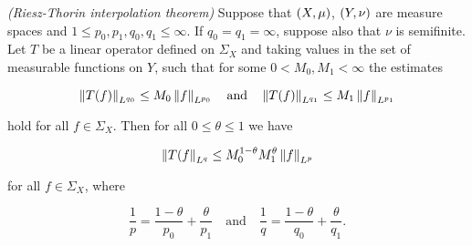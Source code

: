 \vspace{2mm}

\begin{mdframed}
	\begin{theorem}\emph{(Riesz-Thorin interpolation theorem)}
		Suppose that $\del{X,\mu}$, $\del{Y,\nu}$ are measure spaces and $1 \leq p_0,p_1,q_0,q_1 \leq \infty$. If $q_0 = q_1 = \infty$, suppose also that $\nu$ is semifinite. Let $T$ be a linear operator defined on $\Sigma_X$ and taking values in the set of measurable functions on $Y$, such that for some $0 < M_0,M_1 < \infty$ the estimates 

		\begin{equation}
			\norm[0]{T(f)}_{L^{q_0}} \leq M_0\norm[0]{f}_{L^{p_0}} \quad \text{and} \quad \norm[0]{T(f)}_{L^{q_1}} \leq M_1\norm[0]{f}_{L^{p_1}}
			\label{hyp:Lq0Lq1}
		\end{equation}

		\noindent hold for all $f \in \Sigma_X$. Then for all $0 \leq \theta \leq 1$ we have

		\begin{equation}
			\norm[0]{T(f}_{L^q} \leq M_0^{1 - \theta}M_1^\theta\norm[0]{f}_{L^p}
			\label{est:boundTf}
		\end{equation}

		\noindent for all $f \in \Sigma_X$, where

		\begin{equation*}
			\frac{1}{p} = \frac{1 - \theta}{p_0} + \frac{\theta}{p_1} \quad \text{and} \quad \frac{1}{q} = \frac{1 - \theta}{q_0} + \frac{\theta}{q_1}.
		\end{equation*}
		\label{thm:Riesz_Thorin}
	\end{theorem}
\end{mdframed}

